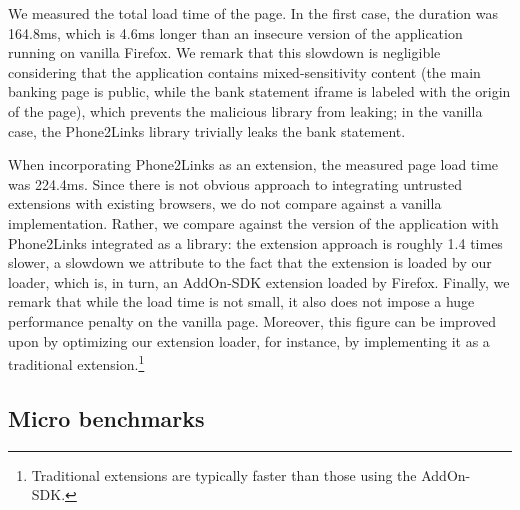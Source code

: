 We measured the total load time of the page. In the first case, the
duration was 164.8ms, which is 4.6ms longer than an insecure version
of the application running on vanilla Firefox.
%
We remark that this slowdown is negligible considering that
the application contains mixed-sensitivity content (the main banking
page is public, while the bank statement iframe is labeled with the
origin of the page), which \sys{} prevents the malicious library from
leaking; in the vanilla case, the Phone2Links library trivially leaks
the bank statement.

When incorporating Phone2Links as an extension, the measured page load
time was 224.4ms.
%
Since there is not obvious approach to integrating untrusted
extensions with existing browsers, we do not compare against a vanilla
implementation.
%
Rather, we compare against the version of the application with
Phone2Links integrated as a library: the extension approach is
roughly 1.4 times slower, a slowdown we attribute to the fact that the
extension is loaded by our loader, which is, in turn, an AddOn-SDK
extension loaded by Firefox.
%
Finally, we remark that while the load time is not small, it also does
not impose a huge performance penalty on the vanilla page.
%
Moreover, this figure can be improved upon by optimizing our
extension loader, for instance, by implementing it as a traditional
extension.\footnote{
  Traditional extensions are typically faster than those using the
  AddOn-SDK.
}




\subsection{Micro benchmarks}
\label{sec:eval:micro}

\newcommand*\rot{\rotatebox{90}}

